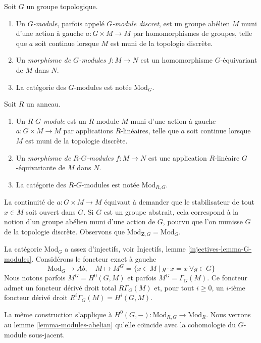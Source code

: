 \begin{definition}
\label{definition-G-module-continuous}
Soit $G$ un groupe topologique.
\begin{enumerate}
\item Un {\it $G$-module}, parfois appel\'e {\it $G$-module discret},
est un groupe ab\'elien $M$ muni d'une action \`a gauche $a : G \times M \to M$
par homomorphismes de groupes, telle que $a$ soit continue lorsque $M$ est muni de la
topologie discr\`ete.
\item Un {\it morphisme de $G$-modules} $f : M \to N$ est un
homomorphisme $G$-\'equivariant de $M$ dans $N$.
\item La cat\'egorie des $G$-modules est not\'ee $\text{Mod}_G$.
\end{enumerate}
Soit $R$ un anneau.
\begin{enumerate}
\item Un {\it $R\text{-}G$-module} est un $R$-module $M$ muni
d'une action \`a gauche $a : G \times M \to M$ par applications $R$-lin\'eaires, telle que $a$
soit continue lorsque $M$ est muni de la topologie discr\`ete.
\item Un {\it morphisme de $R\text{-}G$-modules} $f : M \to N$ est une
application $R$-lin\'eaire $G$-\'equivariante de $M$ dans $N$.
\item La cat\'egorie des $R\text{-}G$-modules est not\'ee $\text{Mod}_{R, G}$.
\end{enumerate}
\end{definition}

\noindent
La continuit\'e de $a : G \times M \to M$ \'equivaut
\`a demander que le stabilisateur de tout $x \in M$ soit ouvert dans $G$.
Si $G$ est un groupe abstrait, cela correspond \`a la notion d'un
groupe ab\'elien muni d'une action de $G$, pourvu que l'on munisse $G$ de la
topologie discr\`ete. Observons que $\text{Mod}_{\mathbf{Z}, G} = \text{Mod}_G$.

\medskip\noindent
La cat\'egorie $\text{Mod}_G$ a assez d'injectifs, voir
Injectifs, lemme \ref{injectives-lemma-G-modules}.
Consid\'erons le foncteur exact \`a gauche
$$
\text{Mod}_G \longrightarrow \textit{Ab},
\quad
M \longmapsto M^G =
\{x \in M \mid g \cdot x = x\ \forall g \in G\}
$$
Nous notons parfois $M^G = H^0(G, M)$ et parfois
$M^G = \Gamma_G(M)$. Ce foncteur admet un foncteur d\'eriv\'e droit total
$R\Gamma_G(M)$ et, pour tout $i \geq 0$, un $i$-i\`eme foncteur d\'eriv\'e droit
$R^i\Gamma_G(M) = H^i(G, M)$.

\medskip\noindent
La m\^eme construction s'applique \`a
$H^0(G, -) : \text{Mod}_{R, G} \to \text{Mod}_R$. Nous verrons au
lemme \ref{lemma-modules-abelian} qu'elle co\"\i ncide avec la cohomologie
du $G$-module sous-jacent.

